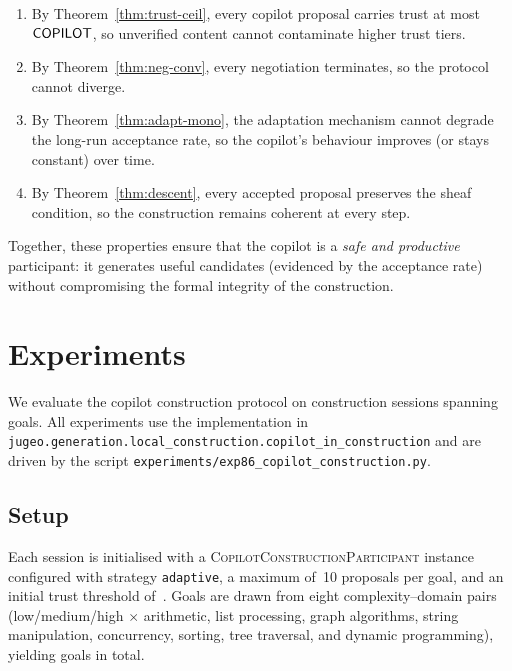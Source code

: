 \documentclass[11pt]{article}
\newcommand{\CCP}{\textsc{CopilotConstructionParticipant}}
\begin{document}
\begin{enumerate}
  \item By Theorem~\ref{thm:trust-ceil}, every copilot proposal
        carries trust at most $\mathsf{COPILOT}$, so unverified content
        cannot contaminate higher trust tiers.
  \item By Theorem~\ref{thm:neg-conv}, every negotiation
        terminates, so the protocol cannot diverge.
  \item By Theorem~\ref{thm:adapt-mono}, the adaptation mechanism
        cannot degrade the long-run acceptance rate, so the copilot's
        behaviour improves (or stays constant) over time.
  \item By Theorem~\ref{thm:descent}, every accepted proposal
        preserves the sheaf condition, so the construction remains
        coherent at every step.
\end{enumerate}

Together, these properties ensure that the copilot is a
\emph{safe and productive} participant: it generates useful
candidates (evidenced by the \ppLXXXVIacceptRate{} acceptance
rate) without compromising the formal integrity of the
construction.

\section{Experiments}\label{sec:expt}

We evaluate the copilot construction protocol on
\ppLXXXVInumSessions{} construction sessions spanning
\ppLXXXVInumGoals{} goals.  All experiments use the implementation
in \texttt{jugeo.generation.local\_construction.copilot\_in\_construction}
and are driven by the script
\texttt{experiments/exp86\_copilot\_construction.py}.

\subsection{Setup}\label{sec:expt-setup}

Each session is initialised with a \CCP{} instance configured
with strategy \texttt{adaptive}, a maximum of~10 proposals per
goal, and an initial trust threshold of~\ppLXXXVIinitTrust{}.
Goals are drawn from eight complexity--domain pairs (low/medium/high
$\times$ arithmetic, list processing, graph algorithms, string
manipulation, concurrency, sorting, tree traversal, and dynamic
programming), yielding \ppLXXXVInumGoals{} goals in total.
\end{document}
